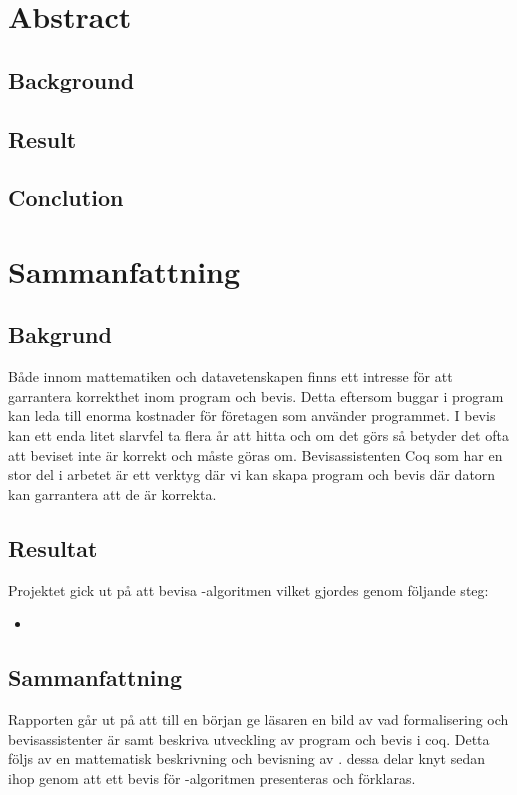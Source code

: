 \section{Abstract}

\subsection{Background}

\subsection{Result}

\subsection{Conclution}



\section{Sammanfattning}

\subsection{Bakgrund}
Både innom mattematiken och datavetenskapen finns ett intresse
för att garrantera korrekthet inom program och bevis. Detta
eftersom buggar i program kan leda till enorma kostnader för
företagen som använder programmet. I bevis kan ett enda litet
slarvfel ta flera år att hitta och om det görs så betyder det
ofta att beviset inte är korrekt och måste göras om.
Bevisassistenten Coq som har en stor del i arbetet är ett
verktyg där vi kan skapa program och bevis där datorn kan
garrantera att de är korrekta.

\subsection{Resultat}
Projektet gick ut på att bevisa \toom -algoritmen vilket gjordes
genom följande steg:
\begin{itemize}
\item 
\end{itemize}


\subsection{Sammanfattning}
Rapporten går ut på att till en början ge läsaren en bild av vad
formalisering och bevisassistenter är samt beskriva utveckling av program
och bevis i coq. Detta följs av en mattematisk beskrivning
och bevisning av \toom. dessa delar knyt sedan ihop genom att
ett bevis för \toom -algoritmen presenteras och förklaras.
